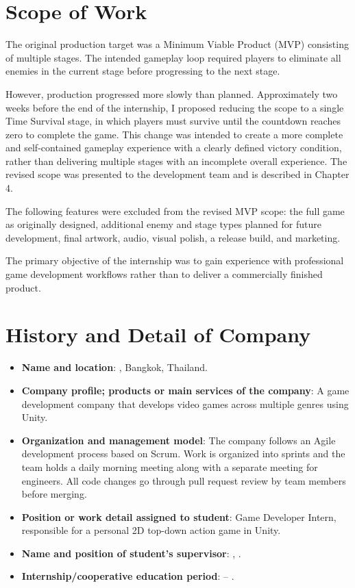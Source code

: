 \section{Scope of Work}
The original production target was a Minimum Viable Product (MVP) consisting of multiple stages. The intended gameplay loop required players to eliminate all enemies in the current stage before progressing to the next stage.

However, production progressed more slowly than planned. Approximately two weeks before the end of the internship, I proposed reducing the scope to a single Time Survival stage, in which players must survive until the countdown reaches zero to complete the game. This change was intended to create a more complete and self-contained gameplay experience with a clearly defined victory condition, rather than delivering multiple stages with an incomplete overall experience. The revised scope was presented to the development team and is described in Chapter 4.

The following features were excluded from the revised MVP scope: the full game as originally designed, additional enemy and stage types planned for future development, final artwork, audio, visual polish, a release build, and marketing.

The primary objective of the internship was to gain experience with professional game development workflows rather than to deliver a commercially finished product.
\newpage
\section{History and Detail of Company}
\begin{itemize}[label=-]
    \item \textbf{Name and location}: \companyName, Bangkok, Thailand.
    \item \textbf{Company profile; products or main services of the company}: A game development company that develops video games across multiple genres using Unity.
    \item \textbf{Organization and management model}: The company follows an Agile development process based on Scrum. Work is organized into sprints and the team holds a daily morning meeting along with a separate meeting for engineers. All code changes go through pull request review by team members before merging.
    \item \textbf{Position or work detail assigned to student}: Game Developer Intern, responsible for a personal 2D top-down action game in Unity.
    \item \textbf{Name and position of student's supervisor}: \supervisorName, \supervisorPosition.
    \item \textbf{Internship/cooperative education period}: \coopStartDate{} -- \coopEndDate.
\end{itemize}

